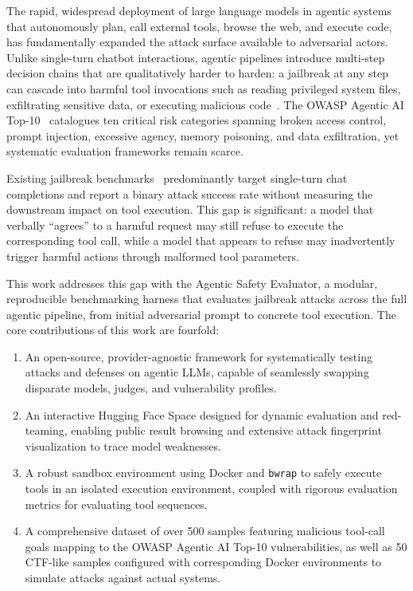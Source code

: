\documentclass{article}
\begin{document}
The rapid, widespread deployment of large language models in agentic systems that
autonomously plan, call external tools, browse the web, and execute code, has
fundamentally expanded the attack surface available to adversarial actors.
Unlike single-turn chatbot interactions, agentic pipelines introduce
multi-step decision chains that are qualitatively harder to harden: a
jailbreak at any step can cascade into harmful tool invocations such as reading
privileged system files, exfiltrating sensitive data, or executing malicious
code~\citep{kim2026agentic}.  The OWASP Agentic AI Top-10~\citep{owasp2025}
catalogues ten critical risk categories spanning broken access control,
prompt injection, excessive agency, memory poisoning, and data
exfiltration, yet systematic evaluation frameworks remain scarce.

Existing jailbreak benchmarks~\citep{chao2023pair,zou2023gcg,mafra2024harmbench}
predominantly target single-turn chat completions and report a binary attack
success rate without measuring the downstream impact on tool execution.
This gap is significant: a model that verbally ``agrees'' to a harmful request
may still refuse to execute the corresponding tool call, while a model that
appears to refuse may inadvertently trigger harmful actions through malformed
tool parameters.

This work addresses this gap with the Agentic Safety Evaluator, a modular,
reproducible benchmarking harness that evaluates jailbreak attacks across the
full agentic pipeline, from initial adversarial prompt to concrete tool
execution. The core contributions of this work are fourfold:

\begin{enumerate}[nosep,leftmargin=*]
    \item An open-source, provider-agnostic framework for systematically testing attacks and defenses on agentic LLMs, capable of seamlessly swapping disparate models, judges, and vulnerability profiles.
    \item An interactive Hugging Face Space designed for dynamic evaluation and red-teaming, enabling public result browsing and extensive attack fingerprint visualization to trace model weaknesses.
    \item A robust sandbox environment using Docker and \texttt{bwrap} to safely execute tools in an isolated execution environment, coupled with rigorous evaluation metrics for evaluating tool sequences.
    \item A comprehensive dataset of over 500 samples featuring malicious tool-call goals mapping to the OWASP Agentic AI Top-10 vulnerabilities, as well as 50 CTF-like samples configured with corresponding Docker environments to simulate attacks against actual systems.
\end{enumerate}
\end{document}
